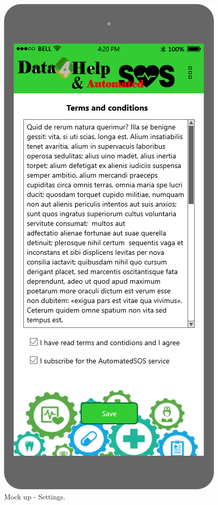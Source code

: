\begin{figure}[h!]
\begin{minipage}[b]{0.25\textwidth}
    		\caption{Mock up - Settings.\\}
	\end{minipage}
	\hfill
	\begin{minipage}[b]{0.25\textwidth}
    		\includegraphics[width=\textwidth]{./pictures/terms_and_conditions.png}

\end{minipage}
\end{figure}
